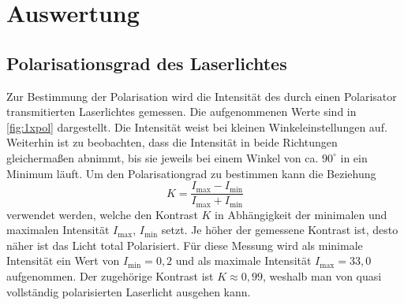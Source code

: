 \documentclass[numbers=noenddot,a4paper,notitlepage,twoside,BCOR15mm]{scrartcl}
\begin{document}
	\newpage
	\section{Auswertung}

\subsection{Polarisationsgrad des Laserlichtes}

Zur Bestimmung der Polarisation wird die Intensität des durch einen Polarisator transmitierten Laserlichtes gemessen. Die aufgenommenen Werte sind in \autoref{fig:1xpol} dargestellt. Die Intensität weist bei kleinen Winkeleinstellungen auf. Weiterhin ist zu beobachten, dass die Intensität in beide Richtungen gleichermaßen abnimmt, bis sie jeweils bei einem Winkel von ca. $90^\circ$ in ein Minimum läuft. Um den Polarisationgrad zu bestimmen kann die Beziehung
\begin{equation}
	K = \frac{I_\mathrm{max}-I_\mathrm{min}}{I_\mathrm{max}+I_\mathrm{min}}
	\label{eq:kontrast}
\end{equation}
verwendet werden, welche den Kontrast $K$ in Abhängigkeit der minimalen und maximalen Intensität $I_\mathrm{max}$, $I_\mathrm{min}$ setzt. Je höher der gemessene Kontrast ist, desto näher ist das Licht total Polarisiert. Für diese Messung wird als minimale Intensität ein Wert von $I_\mathrm{min} = 0,2$ und als maximale Intensität $I_\mathrm{max} = 33,0$ aufgenommen. Der zugehörige Kontrast ist $K \approx 0,99$, weshalb man von quasi vollständig polarisierten Laserlicht ausgehen kann.
\end{document}
